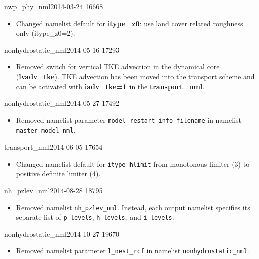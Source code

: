 \begin{changeitem}{nwp\_phy\_nml}{2014-03-24 }{16668 }
  \begin{itemize}
   \item Changed namelist default for \textbf{itype\_z0}: use land cover related roughness only (itype\_z0=2).
  \end{itemize}
\end{changeitem}

\begin{changeitem}{nonhydrostatic\_nml}{2014-05-16 }{17293 }
  \begin{itemize}
   \item Removed switch for vertical TKE advection in the dynamical core (\textbf{lvadv\_tke}). TKE advection has been moved into the
   transport scheme and can be activated with \textbf{iadv\_tke=1} in the \textbf{transport\_nml}.
  \end{itemize}
\end{changeitem}

\begin{changeitem}{nonhydrostatic\_nml}{2014-05-27 }{17492}
  \begin{itemize}
   \item Removed namelist parameter \texttt{model\_restart\_info\_filename} in namelist
         \texttt{master\_model\_nml}.
  \end{itemize}
\end{changeitem}

\begin{changeitem}{transport\_nml}{2014-06-05 }{17654}
  \begin{itemize}
   \item Changed namelist default for \texttt{itype\_hlimit} from monotonous limiter (3) to positive definite limiter (4).
  \end{itemize}
\end{changeitem}

\begin{changeitem}{nh\_pzlev\_nml}{2014-08-28 }{18795}
  \begin{itemize}
   \item Removed namelist \texttt{nh\_pzlev\_nml}.
         Instead, each output namelist specifies its separate list of \texttt{p\_levels}, \texttt{h\_levels},
         and \texttt{i\_levels}.
  \end{itemize}
\end{changeitem}

\begin{changeitem}{nonhydrostatic\_nml}{2014-10-27 }{19670}
  \begin{itemize}
   \item Removed namelist parameter \texttt{l\_nest\_rcf} in namelist
         \texttt{nonhydrostatic\_nml}.
  \end{itemize}
\end{changeitem}

